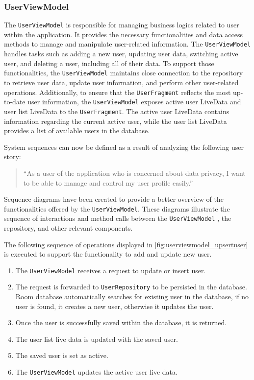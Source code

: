 \subsubsection{UserViewModel}
\label{chap:userviewmodel_design}
The \texttt{UserViewModel} is responsible for managing business logics related to user within the application.
It provides the necessary functionalities and data access methods to manage and manipulate user-related information. 
The \texttt{UserViewModel} handles tasks such as adding a new user, updating user data, switching active user, and deleting a user, including all of their data.
To support those functionalities, the \texttt{UserViewModel} maintains close connection to the repository to retrieve user data, update user information, and perform other user-related operations. 
Additionally, to ensure that the \texttt{UserFragment} reflects the most up-to-date user information, the \texttt{UserViewModel} exposes active user LiveData and user list LiveData to the \texttt{UserFragment}.
The active user LiveData contains information regarding the current active user, while the user list LiveData provides a list of available users in the database.

System sequences can now be defined as a result of analyzing the following user story:
\begin{quotation}
    \enquote{As a user of the application who is concerned about data privacy, I want to be able to manage and control my user profile easily.}
\end{quotation}
Sequence diagrams have been created to provide a better overview of the functionalities offered by the \texttt{UserViewModel}. These diagrams illustrate the sequence of interactions and method calls between the \texttt{UserViewModel} , the repository, and other relevant components.

The following sequence of operations displayed in \autoref{fig:userviewmodel_upsertuser} is executed to support the functionality to add and update new user.
\begin{enumerate}
    \item The \texttt{UserViewModel} receives a request to update or insert user.
    \item The request is forwarded to \texttt{UserRepository} to be persisted in the database. Room database automatically searches for existing user in the database, if no user is found, it creates a new user, otherwise it updates the user.
    \item Once the user is successfully saved within the database, it is returned.
    \item The user list live data is updated with the saved user.
    \item The saved user is set as active.
    \item The \texttt{UserViewModel} updates the active user live data.
\end{enumerate}

